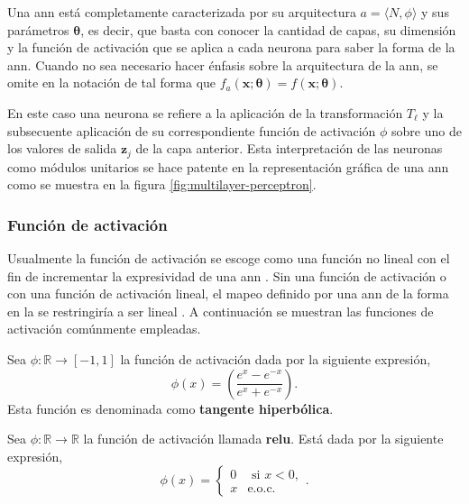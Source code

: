 Una \acrshort{ann} está completamente caracterizada por su arquitectura $a = \langle N, \phi \rangle$ y sus parámetros $\bm\theta$, es decir, que basta con conocer la cantidad de capas, su dimensión y la función de activación que se aplica a cada neurona para saber la forma de la \acrshort{ann}. Cuando no sea necesario hacer énfasis sobre la arquitectura de la \acrshort{ann}, se omite en la notación de tal forma que $f_a(\mathbf{x}; \bm{\theta})=f(\mathbf{x}; \bm{\theta})$.

En este caso una neurona se refiere a la aplicación de la transformación $T_{\ell}$ y la subsecuente aplicación de su correspondiente función de activación $\phi$ sobre uno de los valores de salida $\mathbf{z}_j$ de la capa anterior. Esta interpretación de las neuronas como módulos unitarios se hace patente en la representación gráfica de una \acrshort{ann} como se muestra en la figura \ref{fig:multilayer-perceptron}.

\subsubsection{Función de activación}
Usualmente la función de activación se escoge como una función no lineal con el fin de incrementar la expresividad de una \acrshort{ann} \cite{Roberts_2022}. Sin una función de activación o con una función de activación lineal, el mapeo definido por una \acrshort{ann} de la forma en la  se restringiría a ser lineal \cite{prince2023understanding}. A continuación se muestran las funciones de activación comúnmente empleadas. 

\begin{example}
Sea $\phi: \mathbb{R} \rightarrow [-1, 1]$ la función de activación dada por la siguiente expresión,
$$\phi(x) = \left(\frac{e^{x} -e^{-x}}{e^{x} + e^{-x}}\right).$$
Esta función es denominada como \textbf{tangente hiperbólica}.
\end{example}

\begin{example}
Sea $\phi: \mathbb{R} \rightarrow \mathbb{R}$ la función de activación llamada \textbf{\acrfull{relu}}. Está dada por la siguiente expresión,
$$\phi(x) = 
\begin{cases}
0 & \text{ si } x<0, \\
x & \text{e.o.c.}
\end{cases}
.
$$
\end{example}


